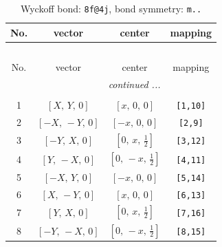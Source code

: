 \documentclass[fleqn,8pt]{jsarticle}
\begin{document}
\begin{longtable}{cccc}
\caption{Wyckoff bond: {\tt 8f@4j}, bond symmetry: {\tt m..}}
 \\
 \hline \hline
No. & vector & center & mapping \\ \hline \endfirsthead

\multicolumn{3}{l}{\tablename\ \thetable{}} \\
 \hline \hline
No. & vector & center & mapping \\ \hline \endhead

 \hline \hline
\multicolumn{3}{r}{\footnotesize\it continued ...} \\ \endfoot

 \hline \hline
\multicolumn{3}{r}{} \\ \endlastfoot

1 & $\left[ X,\, Y,\, 0 \right]$ & $\left[ x,\, 0,\, 0 \right]$ & {\tt [1,10]} \\ \hline
2 & $\left[ - X,\, - Y,\, 0 \right]$ & $\left[ - x,\, 0,\, 0 \right]$ & {\tt [2,9]} \\ \hline
3 & $\left[ - Y,\, X,\, 0 \right]$ & $\left[ 0,\, x,\, \frac{1}{2} \right]$ & {\tt [3,12]} \\ \hline
4 & $\left[ Y,\, - X,\, 0 \right]$ & $\left[ 0,\, - x,\, \frac{1}{2} \right]$ & {\tt [4,11]} \\ \hline
5 & $\left[ - X,\, Y,\, 0 \right]$ & $\left[ - x,\, 0,\, 0 \right]$ & {\tt [5,14]} \\ \hline
6 & $\left[ X,\, - Y,\, 0 \right]$ & $\left[ x,\, 0,\, 0 \right]$ & {\tt [6,13]} \\ \hline
7 & $\left[ Y,\, X,\, 0 \right]$ & $\left[ 0,\, x,\, \frac{1}{2} \right]$ & {\tt [7,16]} \\ \hline
8 & $\left[ - Y,\, - X,\, 0 \right]$ & $\left[ 0,\, - x,\, \frac{1}{2} \right]$ & {\tt [8,15]} \\
\end{longtable}
\renewcommand{\arraystretch}{1.2}
\end{document}
